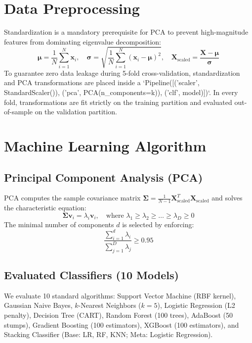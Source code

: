 \documentclass[12pt,a4paper]{article}
\begin{document}
\section{Data Preprocessing}
Standardization is a mandatory prerequisite for PCA to prevent high-magnitude features from dominating eigenvalue decomposition:
$$\mathbf{\mu} = \frac{1}{N} \sum_{i=1}^N \mathbf{x}_i, \quad \mathbf{\sigma} = \sqrt{\frac{1}{N} \sum_{i=1}^N (\mathbf{x}_i - \mathbf{\mu})^2}, \quad \mathbf{X}_{\text{scaled}} = \frac{\mathbf{X} - \mathbf{\mu}}{\mathbf{\sigma}}$$
To guarantee zero data leakage during 5-fold cross-validation, standardization and PCA transformations are placed inside a `Pipeline([('scaler', StandardScaler()), ('pca', PCA(n\_components=k)), ('clf', model)])`. In every fold, transformations are fit strictly on the training partition and evaluated out-of-sample on the validation partition.

\section{Machine Learning Algorithm}
\subsection{Principal Component Analysis (PCA)}
PCA computes the sample covariance matrix $\mathbf{\Sigma} = \frac{1}{N-1} \mathbf{X}_{\text{scaled}}^T \mathbf{X}_{\text{scaled}}$ and solves the characteristic equation:
$$\mathbf{\Sigma} \mathbf{v}_i = \lambda_i \mathbf{v}_i, \quad \text{where } \lambda_1 \ge \lambda_2 \ge \dots \ge \lambda_D \ge 0$$
The minimal number of components $d$ is selected by enforcing:
$$\frac{\sum_{i=1}^d \lambda_i}{\sum_{j=1}^D \lambda_j} \ge 0.95$$

\subsection{Evaluated Classifiers (10 Models)}
We evaluate 10 standard algorithms: Support Vector Machine (RBF kernel), Gaussian Naive Bayes, $k$-Nearest Neighbors ($k=5$), Logistic Regression (L2 penalty), Decision Tree (CART), Random Forest (100 trees), AdaBoost (50 stumps), Gradient Boosting (100 estimators), XGBoost (100 estimators), and Stacking Classifier (Base: LR, RF, KNN; Meta: Logistic Regression).
\end{document}
